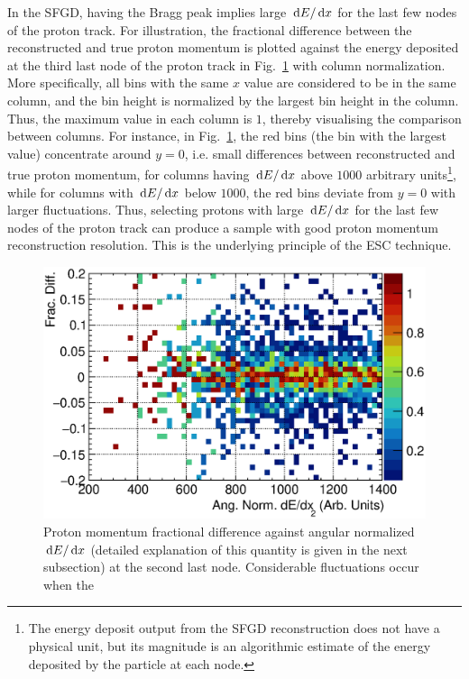      In the SFGD, having the Bragg peak implies large $\,\textrm{d}E/\,\textrm{d}x$ for the last few nodes of the proton track.
     For illustration, the fractional difference between the reconstructed and true proton momentum is plotted against the energy deposited at the third last node of the proton track in Fig.~\ref{fig:dedx-pprres-eg} with column normalization.
     More specifically, all bins with the same $x$ value are considered to be in the same column, and the bin height is normalized by the largest bin height in the column.
     Thus, the maximum value in each column is $1$, thereby visualising the comparison between columns.
     For instance, in Fig.~\ref{fig:dedx-pprres-eg}, the red bins (the bin with the largest value) concentrate around $y=0$, i.e. small differences between reconstructed and true proton momentum, for columns having $\,\textrm{d}E/\,\textrm{d}x$ above $1000$ arbitrary units\footnote{ 
     The energy deposit output from the SFGD reconstruction does not have a physical unit, but its magnitude is an algorithmic estimate of the energy deposited by the particle at each node.}, while for columns with $\,\textrm{d}E/\,\textrm{d}x$ below $1000$, the red bins deviate from $y=0$ with larger fluctuations.
     Thus, selecting protons with large $\,\textrm{d}E/\,\textrm{d}x$ for the last few nodes of the proton track can produce a sample with good proton momentum reconstruction resolution.
     This is the underlying principle of the ESC technique.
    \begin{figure}[htb]
        \centering
        \includegraphics[width=\sgfidwid\linewidth]{figures/sel/fig51.eps}
        \caption{Proton momentum fractional difference against angular normalized $\,\textrm{d}E/\,\textrm{d}x$ (detailed explanation of this quantity is given in the next subsection) at the second last node. Considerable fluctuations occur when the }
        \label{fig:dedx-pprres-eg}
    \end{figure}
    
